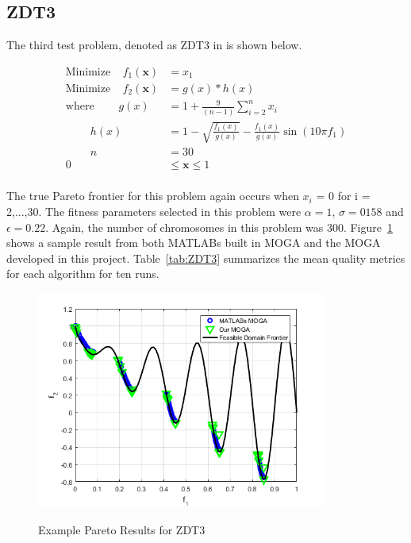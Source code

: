 \documentclass{article}
\begin{document}
\newpage

\subsection{ZDT3} 
The third test problem, denoted as ZDT3 in \cite{deb2001multi} is shown below. 


\begin{align*}
\textrm{Minimize} ~~~~~ f_1(\textbf{x}) &= x_1 \\
\textrm{Minimize} ~~~~~ f_2(\textbf{x}) &= g(x)*h(x) \\
\textrm{where} ~~~~~~~~~~ g(x) &= 1+\frac{9}{(n-1)}\sum_{i=2}^{n}x_i \\
~~~~~~~~~~ h(x) &= 1- \sqrt{\frac{f_1(x)}{g(x)}}- \frac{f_1(x)}{g(x)}\sin(10\pi f_1) \\
~~~~~~~~~~ n &= 30 \\
0 &\leq  \textbf{x}  \leq 1 \\
\end{align*}

\noindent The true Pareto frontier for this problem again occurs when $x_i$ = 0 for i = 2,...,30. The fitness parameters selected in this problem were $\alpha = 1$, $\sigma = 0158$ and $\epsilon = 0.22$. Again, the number of chromosomes in this problem was 300. Figure~\ref{fig:ZDT3} shows a sample result from both MATLABs built in MOGA and the MOGA developed in this project. Table~\ref{tab:ZDT3} summarizes the mean quality metrics for each algorithm for ten runs. \newline

\begin{figure}[H]
  \caption{Example Pareto Results for ZDT3}
  \centering
  \includegraphics[width=0.85\textwidth]{ZDT3_pareto_final.png}  
  \label{fig:ZDT3}
\end{figure}
\end{document}
